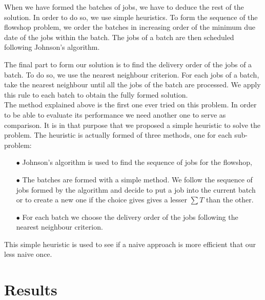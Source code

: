 \documentclass[UTF8, twoside]{EPURapport}
\begin{document}
\clearpage

	When we have formed the batches of jobs, we have to deduce the rest of the solution. In order to do so, we use simple heuristics. To form the sequence of the flowshop problem, we order the batches in increasing order of the minimum due date of the jobs within the batch. The jobs of a batch are then scheduled following Johnson's algorithm.
	
	The final part to form our solution is to find the delivery order of the jobs of a batch. To do so, we use the nearest neighbour criterion. For each jobs of a batch, take the nearest neighbour until all the jobs of the batch are processed. We apply this rule to each batch to obtain the fully formed solution.
\\

	The method explained above is the first one ever tried on this problem. In order to be able to evaluate its performance we need another one to serve as comparison. It is in that purpose that we proposed a simple heuristic to solve the problem. The heuristic is actually formed of three methods, one for each sub-problem:
\begin{itemize}
\item[$\bullet$] Johnson's algorithm is used to find the sequence of jobs for the flowshop,
\item[$\bullet$] The batches are formed with a simple method. We follow the sequence of jobs formed by the algorithm and decide to put a job into the current batch or to create a new one if the choice gives gives a lesser $\sum T$ than the other.
\item[$\bullet$] For each batch we choose the delivery order of the jobs following the nearest neighbour criterion.
\end{itemize}

	This simple heuristic is used to see if a naive approach is more efficient that our less naive once.
	
\chapter{Results}
\end{document}
